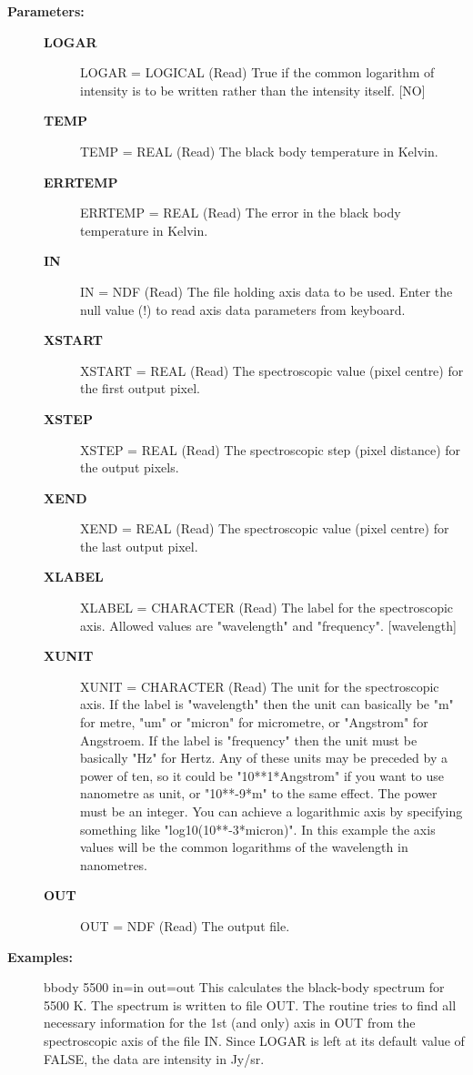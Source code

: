 \begin{description}
\item [\textbf{Parameters:}]
\begin{description}
\item [\textbf{LOGAR}]
LOGAR = LOGICAL (Read)
   True if the common logarithm of intensity is to be written
   rather than the intensity itself. [NO]
\item [\textbf{TEMP}]
TEMP = REAL (Read)
   The black body temperature in Kelvin.
\item [\textbf{ERRTEMP}]
ERRTEMP = REAL (Read)
   The error in the black body temperature in Kelvin.
\item [\textbf{IN}]
IN = NDF (Read)
   The file holding axis data to be used. Enter the null value (!)
   to read axis data parameters from keyboard.
\item [\textbf{XSTART}]
XSTART = REAL (Read)
   The spectroscopic value (pixel centre) for the first output
   pixel.
\item [\textbf{XSTEP}]
XSTEP = REAL (Read)
   The spectroscopic step (pixel distance) for the output pixels.
\item [\textbf{XEND}]
XEND = REAL (Read)
   The spectroscopic value (pixel centre) for the last output
   pixel.
\item [\textbf{XLABEL}]
XLABEL = CHARACTER (Read)
   The label for the spectroscopic axis. Allowed values are
   "wavelength" and "frequency". [wavelength]
\item [\textbf{XUNIT}]
XUNIT = CHARACTER (Read)
   The unit for the spectroscopic axis.
   If the label is "wavelength" then the unit can basically be "m"
   for metre, "um" or "micron" for micrometre, or "Angstrom" for
   Angstroem. If the label is "frequency" then the unit must be
   basically "Hz" for Hertz.
   Any of these units may be preceded by a power of ten, so it
   could be "10**1*Angstrom" if you want to use nanometre as unit,
   or "10**-9*m" to the same effect. The power must be an
   integer.
   You can achieve a logarithmic axis by specifying something like
   "log10(10**-3*micron)". In this example the axis values will be
   the common logarithms of the wavelength in nanometres.
\item [\textbf{OUT}]
OUT = NDF (Read)
   The output file.
\end{description}

\item [\textbf{Examples:}]
\begin{terminalv}
bbody 5500 in=in out=out
   This calculates the black-body spectrum for 5500 K. The
   spectrum is written to file OUT. The routine tries to find all
   necessary information for the 1st (and only) axis in OUT from
   the spectroscopic axis of the file IN. Since LOGAR is left at
   its default value of FALSE, the data are intensity in Jy/sr.


\end{terminalv}
\end{description}

